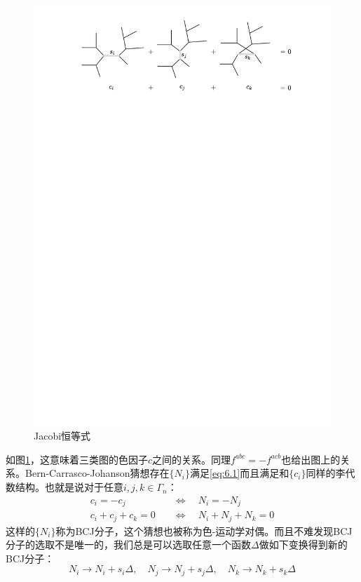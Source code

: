 \begin{figure}[htbp]
	\centering
	\includegraphics[width=0.95\linewidth]{figs/fig9.pdf}
	\caption{Jacobi恒等式}
	\label{fig:6.2}
\end{figure}
如图\ref{fig:6.2}，这意味着三类图的色因子$c$之间的关系。同理$f^{abc}=-f^{acb}$也给出图上的关系。Bern-Carrasco-Johanson猜想存在$\{N_i\}$满足\ref{eq:6.1}而且满足和$\{c_i\}$同样的李代数结构\cite{Bern:2008qj}。也就是说对于任意$i,j,k\in\Gamma_n$：
\begin{equation}
\begin{aligned}
		c_i=-c_j\quad&\Leftrightarrow\quad N_i=-N_j\\
	c_i+c_j+c_k=0\quad&\Leftrightarrow\quad N_i+N_j+N_k=0
\end{aligned}
\end{equation}
这样的$\{N_i\}$称为BCJ分子，这个猜想也被称为色-运动学对偶。而且不难发现BCJ分子的选取不是唯一的，我们总是可以选取任意一个函数$\Delta$做如下变换得到新的BCJ分子：
\begin{equation}
	\label{eq:6.5}
	N_i\to N_i+s_i\Delta,\quad N_j\to N_j+s_j\Delta,\quad N_k\to N_k+s_k\Delta
\end{equation}
